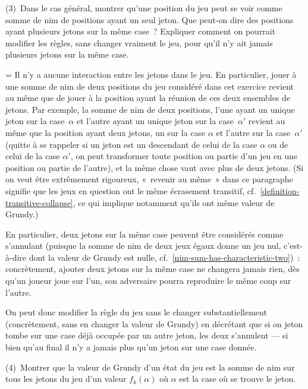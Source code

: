 \documentclass[12pt,a4paper]{article}
\theoremstyle{definition}
\newif\ifcorrige
\newenvironment{corrige}%
{\ifcorrige\relax\else\setbox0=\vbox\bgroup\fi%
\smallbreak\noindent{\underbar{\textit{Corrigé.}}\quad}}
{{\hbox{}\nobreak\hfill\checkmark}%
\ifcorrige\relax\else\egroup\fi\par}
\begin{document}
\smallbreak

(3) Dans le cas général, montrer qu'une position du jeu peut se voir
comme somme de nim de positions ayant un seul jeton.  Que peut-on dire
des positions ayant plusieurs jetons sur la même case ?  Expliquer
comment on pourrait modifier les règles, sans changer vraiment le jeu,
pour qu'il n'y ait jamais plusieurs jetons sur la même case.

\begin{corrige}
Il n'y a aucune interaction entre les jetons dans le jeu.  En
particulier, jouer à une somme de nim de deux positions du jeu
considéré dans cet exercice revient au même que de jouer à la position
ayant la réunion de ces deux ensembles de jetons.  Par exemple, la
somme de nim de deux positions, l'une ayant un unique jeton sur la
case $\alpha$ et l'autre ayant un unique jeton sur la case $\alpha'$
revient au même que la position ayant deux jetons, un sur la case
$\alpha$ et l'autre sur la case $\alpha'$ (quitte à se rappeler si un
jeton est un descendant de celui de la case $\alpha$ ou de celui de la
case $\alpha'$, on peut transformer toute position ou partie d'un jeu
en une position ou partie de l'autre), et la même chose vaut avec plus
de deux jetons.  (Si on veut être extrêmement rigoureux, « revenir au
  même » dans ce paragraphe signifie que les jeux en question ont le
même écrasement transitif, cf. \ref{definition-transitive-collapse},
ce qui implique notamment qu'ils ont même valeur de Grundy.)

En particulier, deux jetons sur la même case peuvent être considérés
comme s'annulant (puisque la somme de nim de deux jeux égaux donne un
jeu nul, c'est-à-dire dont la valeur de Grundy est nulle,
cf. \ref{nim-sum-has-characteristic-two}) : concrètement, ajouter deux
jetons sur la même case ne changera jamais rien, dès qu'un joueur joue
sur l'un, son adversaire pourra reproduire le même coup sur l'autre.

On peut donc modifier la règle du jeu sans le changer
substantiellement (concrètement, sans en changer la valeur de Grundy)
en décrétant que si on jeton tombe sur une case déjà occupée par un
autre jeton, les deux s'annulent — si bien qu'au final il n'y a jamais
plus qu'un jeton sur une case donnée.
\end{corrige}

\smallbreak

(4) Montrer que la valeur de Grundy d'un état du jeu est la somme de
nim sur tous les jetons du jeu d'un valeur $f_k(\alpha)$ où $\alpha$
est la case où se trouve le jeton.
\end{document}
